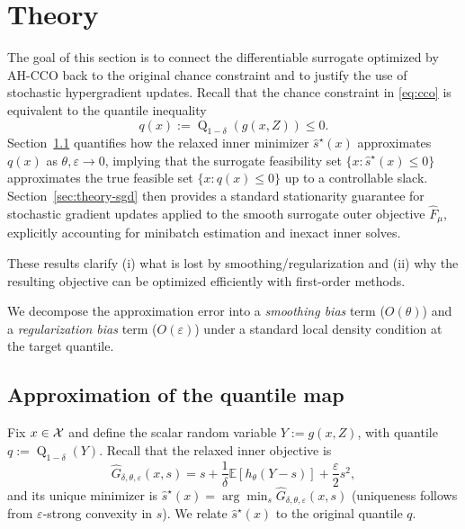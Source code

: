 \documentclass{uai2026} %
\theoremstyle{plain}
\theoremstyle{definition}
\newcommand{\Q}{\operatorname{Q}}
\begin{document}

\section{Theory}\label{sec:theory}
The goal of this section is to connect the differentiable surrogate optimized by AH-CCO back to the original chance constraint and to justify the use of stochastic hypergradient updates.
Recall that the chance constraint in \eqref{eq:cco} is equivalent to the quantile inequality
\[
  q(x):=\Q_{1-\delta}(g(x,Z))\le 0.
\]
Section~\ref{sec:theory-approx} quantifies how the relaxed inner minimizer $\widehat s^\star(x)$ approximates $q(x)$ as $\theta,\varepsilon\to 0$, implying that the surrogate feasibility set $\{x:\widehat s^\star(x)\le 0\}$ approximates the true feasible set $\{x:q(x)\le 0\}$ up to a controllable slack.
Section~\ref{sec:theory-sgd} then provides a standard stationarity guarantee for stochastic gradient updates applied to the smooth surrogate outer objective $\widehat F_\mu$, explicitly accounting for minibatch estimation and inexact inner solves.

These results clarify (i) what is lost by smoothing/regularization and (ii) why the resulting objective can be optimized efficiently with first-order methods.

We decompose the approximation error into a \emph{smoothing bias} term ($O(\theta)$) and a \emph{regularization bias} term ($O(\varepsilon)$) under a standard local density condition at the target quantile.

\subsection{Approximation of the quantile map}\label{sec:theory-approx}
Fix $x\in\mathcal{X}$ and define the scalar random variable $Y:=g(x,Z)$, with quantile $q:=\Q_{1-\delta}(Y)$.
Recall that the relaxed inner objective is
\[
  \widehat G_{\delta,\theta,\varepsilon}(x,s)
  =
  s + \frac{1}{\delta}\mathbb{E}\!\left[h_\theta(Y-s)\right] + \frac{\varepsilon}{2}s^2,
\]
and its unique minimizer is $\widehat s^\star(x)=\arg\min_s \widehat G_{\delta,\theta,\varepsilon}(x,s)$ (uniqueness follows from $\varepsilon$-strong convexity in $s$).
We relate $\widehat s^\star(x)$ to the original quantile $q$.
\end{document}
